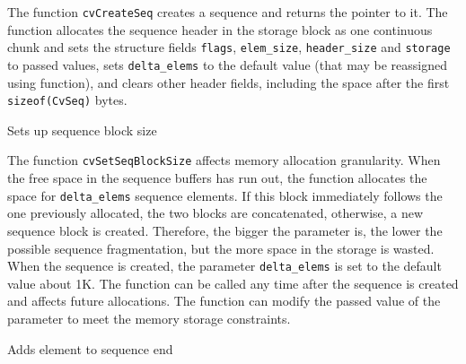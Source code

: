 The function \texttt{cvCreateSeq} creates a sequence and returns
the pointer to it. The function allocates the sequence header in
the storage block as one continuous chunk and sets the structure
fields \texttt{flags}, \texttt{elem\_size}, \texttt{header\_size} and
\texttt{storage} to passed values, sets \texttt{delta\_elems} to the
default value (that may be reassigned using 
function), and clears other header fields, including the space after
the first \texttt{sizeof(CvSeq)} bytes.

\label{SetSeqBlockSize}

Sets up sequence block size


\begin{description}
\end{description}


The function \texttt{cvSetSeqBlockSize} affects memory allocation
granularity. When the free space in the sequence buffers has run out,
the function allocates the space for \texttt{delta\_elems} sequence
elements. If this block immediately follows the one previously allocated,
the two blocks are concatenated, otherwise, a new sequence block is
created. Therefore, the bigger the parameter is, the lower the possible
sequence fragmentation, but the more space in the storage is wasted. When
the sequence is created, the parameter \texttt{delta\_elems} is set to
the default value  about 1K. The function can be called any time after
the sequence is created and affects future allocations. The function
can modify the passed value of the parameter to meet the memory storage
constraints.

\label{SeqPush}

Adds element to sequence end


\begin{description}
\end{description}


